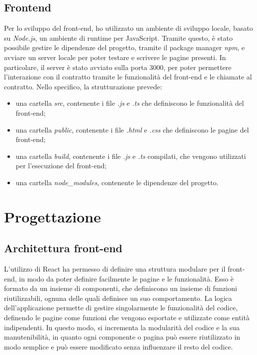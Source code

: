\subsection{Frontend}
Per lo sviluppo del front-end, ho utilizzato un ambiente di sviluppo locale, basato su \textit{Node.js}, un ambiente di runtime per JavaScript.
Tramite questo, è stato possibile gestire le dipendenze del progetto, tramite il package manager \textit{npm}, e avviare un server locale per poter testare
e scrivere le pagine presenti. In particolare, il server è stato avviato sulla porta 3000, per poter permettere l'interazione con il contratto tramite
le funzionalità del front-end e le chiamate al contratto.
Nello specifico, la strutturazione prevede:
\begin{itemize}
    \item una cartella \textit{src}, contenente i file \textit{.js} e \textit{.ts} che definiscono le funzionalità del front-end;
    \item una cartella \textit{public}, contenente i file \textit{.html} e \textit{.css} che definiscono le pagine del front-end;
    \item una cartella \textit{build}, contenente i file \textit{.js} e \textit{.ts} compilati, che vengono utilizzati per l'esecuzione del front-end;
    \item una cartella \textit{node\_modules}, contenente le dipendenze del progetto.
\end{itemize}

\newpage
\section{Progettazione}\label{sec:progettazione-requisiti}

\subsection{Architettura front-end}

L'utilizzo di React ha permesso di definire una struttura modulare per il front-end, in modo da poter definire facilmente le pagine e le funzionalità.
Esso è formato da un insieme di componenti, che definiscono un insieme di funzioni riutilizzabili, ognuna delle quali definisce un suo comportamento. 
La logica dell'applicazione permette di gestire singolarmente le funzionalità del codice, definendo le pagine come funzioni che vengono
esportate e utilizzate come entità indipendenti. In questo modo, si incrementa la modularità del codice e la sua manutenibilità, in quanto ogni componente
o pagina può essere riutilizzato in modo semplice e può essere modificato senza influenzare il resto del codice. \\

